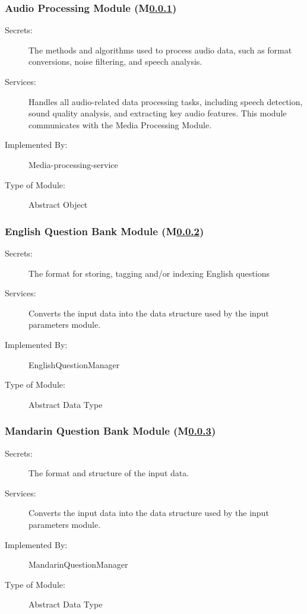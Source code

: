 \documentclass[12pt, titlepage]{article}
\newcounter{mnum}
\newcommand{\mref}[1]{M\ref{#1}}
\begin{document}
\subsubsection{Audio Processing Module (\mref{mAudioProcessing})}
\label{mAudioProcessing}
\begin{description}
\item[Secrets:] The methods and algorithms used to process audio data, such as format conversions, noise filtering, and speech analysis.
\item[Services:] Handles all audio-related data processing tasks, including speech detection, sound quality analysis, and extracting key audio features. This module communicates with the Media Processing Module.
\item[Implemented By:] Media-processing-service
\item[Type of Module:] Abstract Object
\end{description}

\subsubsection{English Question Bank Module (\mref{mEnglishBank})}
\label{mEnglishBank}

\begin{description}
\item[Secrets:]The format for storing, tagging and/or indexing English questions
\item[Services:]Converts the input data into the data structure used by the
  input parameters module.
\item[Implemented By:] EnglishQuestionManager
\item[Type of Module:] Abstract Data Type
\end{description}

\subsubsection{Mandarin Question Bank Module (\mref{mMandarinBank})}
\label{mMandarinBank}

\begin{description}
\item[Secrets:]The format and structure of the input data.
\item[Services:]Converts the input data into the data structure used by the
  input parameters module.
\item[Implemented By:] MandarinQuestionManager
\item[Type of Module:] Abstract Data Type
\end{description}
\end{document}
